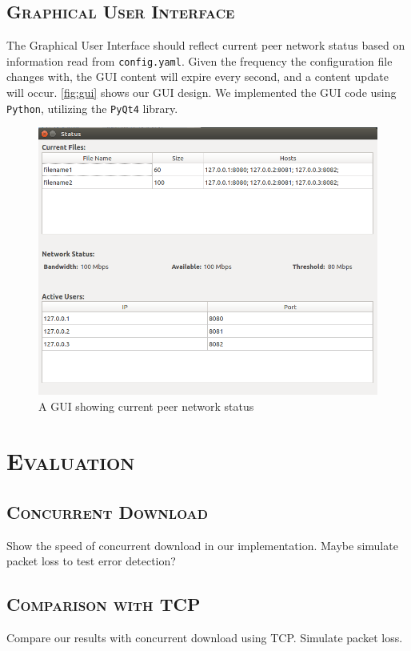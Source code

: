 \subsection*{\scshape Graphical User Interface}
The Graphical User Interface should reflect current peer network status based on information read from \texttt{config.yaml}. Given the frequency the configuration file changes with, the GUI content will expire every second, and a content update will occur. \autoref{fig:gui} shows our GUI design. We implemented the GUI code using \texttt{Python}, utilizing the \texttt{PyQt4} library.
\begin{figure}[H]
\centering
   \includegraphics[width=1\linewidth]{gui}
   \caption{A GUI showing current peer network status}
   	\label{fig:gui}
\end{figure}


\section*{\scshape Evaluation}
\subsection*{\scshape Concurrent Download}
Show the speed of concurrent download in our implementation. Maybe simulate packet loss to test error detection?

\subsection*{\scshape Comparison with TCP}
Compare our results with concurrent download using TCP. Simulate packet loss. 




